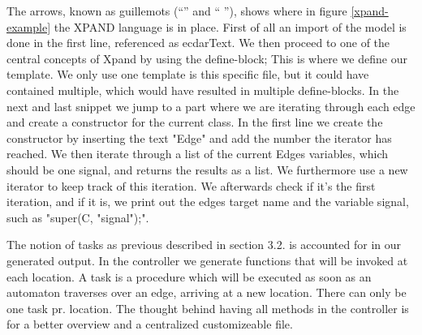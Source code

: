 The arrows, known as guillemots (``\guillemotleft'' and `` \guillemotright''),
shows where in figure \ref{xpand-example} the XPAND language is in place. First
of all an import of the model is done in the first line, referenced as
ecdarText. We then proceed to one of the central concepts of Xpand by using the
define-block; This is where we define our template. We only use one template is
this specific file, but it could have contained multiple, which would have
resulted in multiple define-blocks. In the next and last snippet we jump to a
part where we are iterating through each edge and create a constructor for the
current class. In the first line we create the constructor by inserting the text
"Edge" and add the number the iterator has reached. We then iterate through a
list of the current Edges variables, which should be one signal, and returns the
results as a list. We furthermore use a new iterator to keep track of this
iteration. We afterwards check if it's the first iteration, and if it is, we
print out the edges target name and the variable signal, such as "super(C,
"signal");".

The notion of tasks as previous described in section 3.2. is accounted for in
our generated output. In the controller we generate functions that will be
invoked at each location. A task is a procedure which will be executed as soon
as an automaton traverses over an edge, arriving at a new location. There can
only be one task pr. location. The thought behind having all methods in the
controller is for a better overview and a centralized customizeable file.
